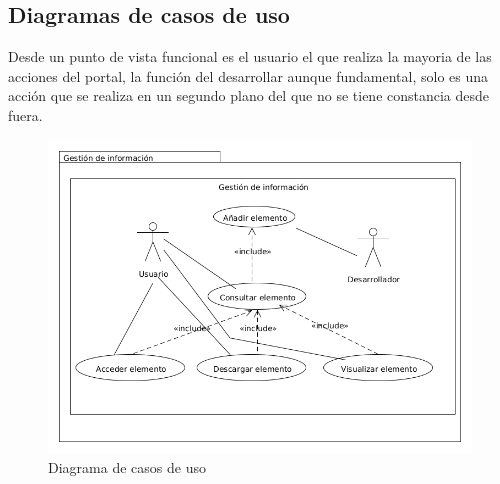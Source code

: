 \subsection{Diagramas de casos de uso}

Desde un punto de vista funcional es el usuario el que realiza la mayoria de las acciones del portal, la función del 
desarrollar aunque fundamental, solo es una acción que se realiza en un segundo plano del que no se tiene constancia desde 
fuera.

\begin{figure}[!h]
  \begin{center}
  \includegraphics[width=1\textwidth]{imagenes/diagrama_casos_uso.png}
  \caption[Casos de uso]{Diagrama de casos de uso}
  \label{fig:casosUso}
  \end{center}
\end{figure}

